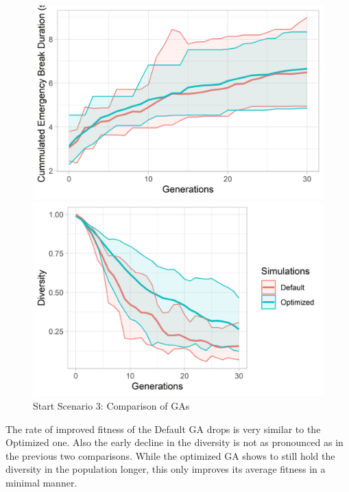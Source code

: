 \begin{figure}[ht] 
	\label{figure:sim_3_ga_comparison}
	\begin{minipage}[b]{0.5\linewidth}
		\centering
		\includegraphics[width=1\linewidth]{simulations/evaluation/plots/sim_3_ga_generations} 
	\end{minipage}%
	\begin{minipage}[b]{0.5\linewidth}
		\centering
		\includegraphics[width=1\linewidth]{simulations/evaluation/plots/sim_3_ga_diversity} 
	\end{minipage} 
	\caption{Start Scenario 3: Comparison of GAs}
\end{figure}


The rate of improved fitness of the Default GA drops is very similar to the Optimized one. Also the early decline in the diversity is not as pronounced as in the previous two comparisons. While the optimized GA shows to still hold the diversity in the population longer, this only improves its average fitness in a minimal manner.

